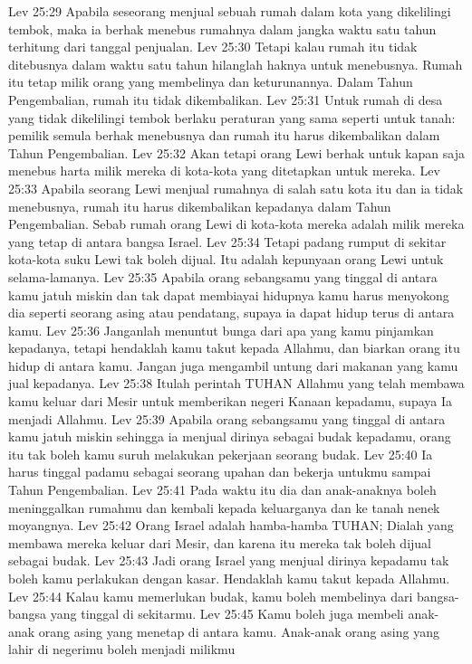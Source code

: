 Lev 25:29  Apabila seseorang menjual sebuah rumah dalam kota yang dikelilingi tembok, maka ia berhak menebus rumahnya dalam jangka waktu satu tahun terhitung dari tanggal penjualan.
Lev 25:30  Tetapi kalau rumah itu tidak ditebusnya dalam waktu satu tahun hilanglah haknya untuk menebusnya. Rumah itu tetap milik orang yang membelinya dan keturunannya. Dalam Tahun Pengembalian, rumah itu tidak dikembalikan.
Lev 25:31  Untuk rumah di desa yang tidak dikelilingi tembok berlaku peraturan yang sama seperti untuk tanah: pemilik semula berhak menebusnya dan rumah itu harus dikembalikan dalam Tahun Pengembalian.
Lev 25:32  Akan tetapi orang Lewi berhak untuk kapan saja menebus harta milik mereka di kota-kota yang ditetapkan untuk mereka.
Lev 25:33  Apabila seorang Lewi menjual rumahnya di salah satu kota itu dan ia tidak menebusnya, rumah itu harus dikembalikan kepadanya dalam Tahun Pengembalian. Sebab rumah orang Lewi di kota-kota mereka adalah milik mereka yang tetap di antara bangsa Israel.
Lev 25:34  Tetapi padang rumput di sekitar kota-kota suku Lewi tak boleh dijual. Itu adalah kepunyaan orang Lewi untuk selama-lamanya.
Lev 25:35  Apabila orang sebangsamu yang tinggal di antara kamu jatuh miskin dan tak dapat membiayai hidupnya kamu harus menyokong dia seperti seorang asing atau pendatang, supaya ia dapat hidup terus di antara kamu.
Lev 25:36  Janganlah menuntut bunga dari apa yang kamu pinjamkan kepadanya, tetapi hendaklah kamu takut kepada Allahmu, dan biarkan orang itu hidup di antara kamu. Jangan juga mengambil untung dari makanan yang kamu jual kepadanya.
Lev 25:38  Itulah perintah TUHAN Allahmu yang telah membawa kamu keluar dari Mesir untuk memberikan negeri Kanaan kepadamu, supaya Ia menjadi Allahmu.
Lev 25:39  Apabila orang sebangsamu yang tinggal di antara kamu jatuh miskin sehingga ia menjual dirinya sebagai budak kepadamu, orang itu tak boleh kamu suruh melakukan pekerjaan seorang budak.
Lev 25:40  Ia harus tinggal padamu sebagai seorang upahan dan bekerja untukmu sampai Tahun Pengembalian.
Lev 25:41  Pada waktu itu dia dan anak-anaknya boleh meninggalkan rumahmu dan kembali kepada keluarganya dan ke tanah nenek moyangnya.
Lev 25:42  Orang Israel adalah hamba-hamba TUHAN; Dialah yang membawa mereka keluar dari Mesir, dan karena itu mereka tak boleh dijual sebagai budak.
Lev 25:43  Jadi orang Israel yang menjual dirinya kepadamu tak boleh kamu perlakukan dengan kasar. Hendaklah kamu takut kepada Allahmu.
Lev 25:44  Kalau kamu memerlukan budak, kamu boleh membelinya dari bangsa-bangsa yang tinggal di sekitarmu.
Lev 25:45  Kamu boleh juga membeli anak-anak orang asing yang menetap di antara kamu. Anak-anak orang asing yang lahir di negerimu boleh menjadi milikmu
